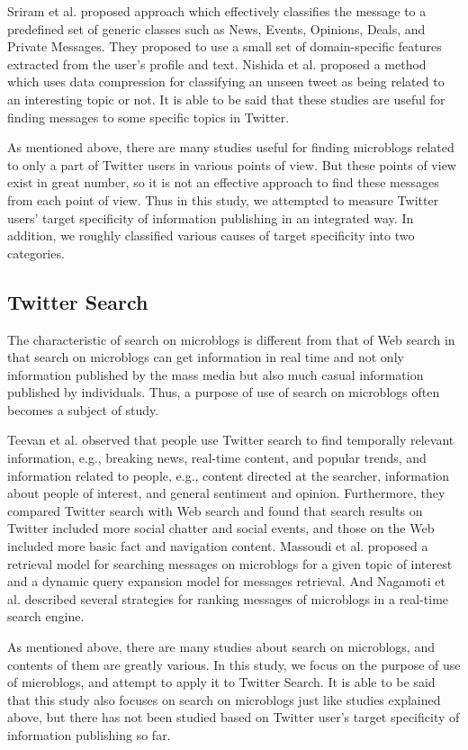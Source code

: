 Sriram et al.\cite{sriram2010short} proposed approach which effectively
classifies the message to a predefined set of generic classes such as
News, Events, Opinions, Deals, and Private Messages.  They proposed to
use a small set of domain-specific features extracted from the user's
profile and text.  Nishida et al.\cite{nishida2011tweet} proposed a
method which uses data compression for classifying an unseen tweet as
being related to an interesting topic or not.  It is able to be
said that these studies are useful for finding messages to some specific
topics in Twitter.

As mentioned above, there are many studies useful for finding microblogs
related to only a part of Twitter users in various points of
view.  But these points of view exist in great number, so it is not an
effective approach to find these messages from each point of view.
Thus in this study, we attempted to measure Twitter users' target
specificity of information publishing in an integrated way.  In
addition, we roughly classified various causes of target specificity
into two categories.

\subsection{Twitter Search}
\label{subsec:Twitter Search}

The characteristic of search on microblogs is different
from that of Web search\cite{broder2002taxonomy} in that search on
microblogs can get information in real
time\cite{busch2012earlybird} and not only information published by the
mass media but also much casual information published by
individuals\cite{java2007we}.  Thus, a purpose of use of search on
microblogs often becomes a subject of study.

Teevan et al.\cite{teevan2011twittersearch} observed that people use
Twitter search to find temporally relevant information, e.g., breaking
news, real-time content, and popular trends, and information related to
people, e.g., content directed at the searcher, information about
people of interest, and general sentiment and opinion.  Furthermore,
they compared Twitter search with Web search and found that search
results on Twitter included more social chatter and social events, and
those on the Web included more basic fact and navigation content.
Massoudi et al.\cite{massoudi2011incorporating} proposed a retrieval
model for searching messages on microblogs for a given topic
of interest and a dynamic query expansion model for messages retrieval.
And Nagamoti et al.\cite{nagmoti2010ranking} described several
strategies for ranking messages of microblogs in a
real-time search engine.

As mentioned above, there are many studies about search on microblogs,
and contents of them are greatly various.  In this study, we
focus on the purpose of use of microblogs, and attempt to
apply it to Twitter Search.  It is able to be said that this study also
focuses on search on microblogs just like studies explained
above, but there has not been studied based on Twitter user's target
specificity of information publishing so far.